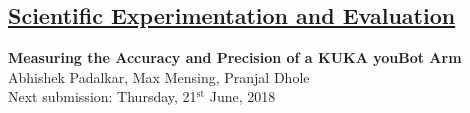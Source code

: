 \documentclass[11pt,a4paper,openright,twoside]{extreport}
\begin{document}
\begin{center}
\section*{\underline{Scientific Experimentation and Evaluation}}
\large{\textbf{Measuring the Accuracy and Precision of a KUKA youBot Arm}}\\
\large{Abhishek Padalkar, Max Mensing, Pranjal Dhole}\\
\large{Next submission: Thursday, 21$^{\text{st}}$ June, 2018}
\end{center}



\end{document}
